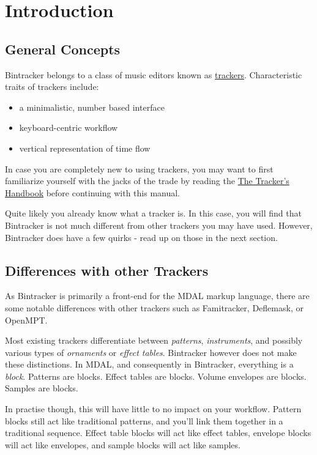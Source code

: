 \documentclass[12pt]{report}	%
\begin{document}
\chapter{Introduction}
\section{General Concepts}

Bintracker belongs to a class of music editors known as \href{https://en.wikipedia.org/wiki/Tracker_\%28music_software\%29}{trackers}. Characteristic traits of trackers include:

\begin{itemize}
\item a minimalistic, number based interface
\item keyboard-centric workflow
\item vertical representation of time flow
\end{itemize}

In case you are completely new to using trackers, you may want to first familiarize yourself with the jacks of the trade by reading the \href{http://resources.openmpt.org/tracker_handbook/handbook.htm}{The Tracker's Handbook} before continuing with this manual.

Quite likely you already know what a tracker is. In this case, you will find that Bintracker is not much different from other trackers you may have used. However, Bintracker does have a few quirks - read up on those in the next section.



\section{Differences with other Trackers}

As Bintracker is primarily a front-end for the MDAL markup language, there are some notable differences with other trackers such as Famitracker, Deflemask, or OpenMPT.

Most existing trackers differentiate between \textit{patterns}, \textit{instruments}, and possibly various types of \textit{ornaments} or \textit{effect tables}. Bintracker however does not make these distinctions. In MDAL, and consequently in Bintracker, everything is a \textit{block}. Patterns are blocks. Effect tables are blocks. Volume envelopes are blocks. Samples are blocks. 

In practise though, this will have little to no impact on your workflow. Pattern blocks still act like traditional patterns, and you'll link them together in a traditional sequence. Effect table blocks will act like effect tables, envelope blocks will act like envelopes, and sample blocks will act like samples.
\end{document}
